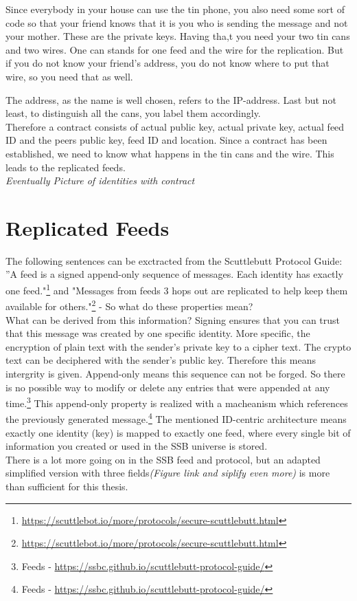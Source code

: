 Since everybody in your house can use the tin phone, you also need some sort of code so that your friend knows that it is you who is sending the message and not your mother. These are the private keys. Having tha,t you need your two tin cans and two wires. One can stands for one feed and the wire for the replication. But if you do not know your friend’s address, you do not know where to put that wire, so you need that as well. 

The address, as the name is well chosen, refers to the IP-address. Last but not least, to distinguish all the cans, you label them accordingly. \\

Therefore a contract consists of actual public key, actual private key, actual feed ID and the peers public key, feed ID and location. Since a contract has been established, we need to know what happens in the tin cans and the wire. This leads to the replicated feeds.\\

\textit{Eventually Picture of identities with contract}

\section{Replicated Feeds}
The following sentences can be exctracted from the Scuttlebutt Protocol Guide: ”A feed is a signed append-only sequence of messages. Each identity has exactly one feed."\footnote{\url{https://scuttlebot.io/more/protocols/secure-scuttlebutt.html}} and "Messages from feeds 3 hops out are replicated to help keep them available for others."\footnote{\url{https://scuttlebot.io/more/protocols/secure-scuttlebutt.html}} - So what do these properties mean?\\

What can be derived from this information? Signing ensures that you can trust that this message was created by one specific identity. More specific, the encryption of plain text with the sender’s private key to a cipher text. The crypto text can be deciphered with the sender’s public key. Therefore this means intergrity is given. Append-only means this sequence can not be forged. So there is no possible way to modify or delete any entries that were appended at any time.\footnote{Feeds - \url{https://ssbc.github.io/scuttlebutt-protocol-guide/}} This append-only property is realized with a macheanism which references the previously generated message.\footnote{Feeds - \url{https://ssbc.github.io/scuttlebutt-protocol-guide/}} The mentioned ID-centric architecture means exactly one identity (key) is mapped to exactly one feed, where every single bit of information you created or used in the SSB universe is stored.
\\
There is a lot more going on in the SSB feed and protocol, but an adapted simplified version with three fields\textit{(Figure link and siplify even more)} is more than sufficient for this thesis. 

